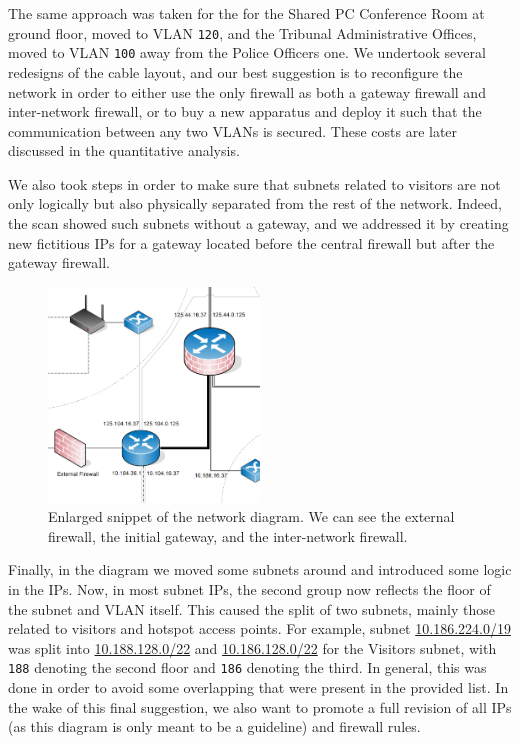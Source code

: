 The same approach was taken for the for the Shared PC Conference Room at ground floor, moved to VLAN \verb=120=, and the Tribunal Administrative Offices, moved to VLAN \verb=100= away from the Police Officers one. We undertook several redesigns of the cable layout, and our best suggestion is to reconfigure the network in order to either use the only firewall as both a gateway firewall and inter-network firewall, or to buy a new apparatus and deploy it such that the communication between any two VLANs is secured. These costs are later discussed in the quantitative analysis. 

We also took steps in order to make sure that subnets related to visitors are not only logically but also physically separated from the rest of the network. Indeed, the scan showed such subnets without a gateway, and we addressed it by creating new fictitious IPs for a gateway located before the central firewall but after the gateway firewall.

\begin{figure}[!h]
	\centering
	\includegraphics[width=0.5\textwidth]{drawable/detail-network.png}
	\caption{Enlarged snippet of the network diagram. We can see the external firewall, the initial gateway, and the inter-network firewall.}
	\label{fig:detail-network}
\end{figure}

Finally, in the diagram we moved some subnets around and introduced some logic in the IPs. Now, in most subnet IPs, the second group now reflects the floor of the subnet and VLAN itself. This caused the split of two subnets, mainly those related to visitors and hotspot access points. For example, subnet \url{10.186.224.0/19} was split into \url{10.188.128.0/22} and \url{10.186.128.0/22} for the Visitors subnet, with \verb=188= denoting the second floor and \verb=186= denoting the third. In general, this was done in order to avoid some overlapping that were present in the provided list. In the wake of this final suggestion, we also want to promote a full revision of all IPs (as this diagram is only meant to be a guideline) and firewall rules.

